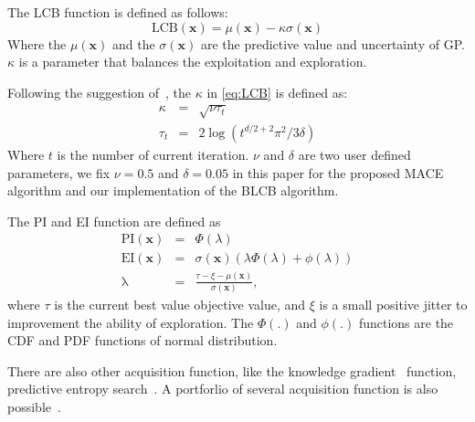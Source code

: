 The LCB function is defined as follows:
\begin{equation}
    \label{eq:LCB}
    \mathrm{LCB}(\bm{x}) = \mu(\bm{x}) - \kappa \sigma(\bm{x})
\end{equation}
Where the $\mu(\bm{x})$ and the $\sigma(\bm{x})$ are the predictive value and uncertainty of GP. $\kappa$ is a parameter that balances the exploitation and exploration. 

Following the suggestion of~\cite{brochu2010tutorial}, the $\kappa$ in \eqref{eq:LCB} is defined as:
\begin{equation}
    \label{eq:LCB}
    \begin{array}{lll}
        \kappa &=& \sqrt{\nu \tau_t} \\
        \tau_t &=& 2 \log(t^{d/2+2} \pi^2 / 3 \delta)
    \end{array}
\end{equation}
Where $t$ is the number of current iteration. $\nu$ and $\delta$ are two user defined parameters, we fix $\nu = 0.5$ and $\delta = 0.05$ in this paper for the proposed MACE algorithm and our implementation of the BLCB algorithm.

The PI and EI function are defined as
\begin{equation}
    \label{eq:PI_EI}
    \begin{array}{lll}
        \mathrm{PI}(\bm{x}) &=& \Phi(\lambda) \\
        \mathrm{EI}(\bm{x}) &=& \sigma(\bm{x}) (\lambda \Phi(\lambda) + \phi(\lambda))     \\
        \mathrm{\lambda}    &=& \displaystyle \frac{\tau - \xi - \mu(\bm{x})}{\sigma(\bm{x})}, 
    \end{array}
\end{equation}
where $\tau$ is the current best value objective value, and $\xi$ is a small positive jitter to improvement the ability of exploration. The $\Phi(.)$ and $\phi(.)$ functions are the CDF and PDF functions of normal distribution.


There are also other acquisition function, like the knowledge gradient~\cite{scott2011correlated} function, predictive entropy search~\cite{hernandez2014predictive}. A portforlio of several acquisition function is also possible~\cite{hoffman2011portfolio}.
